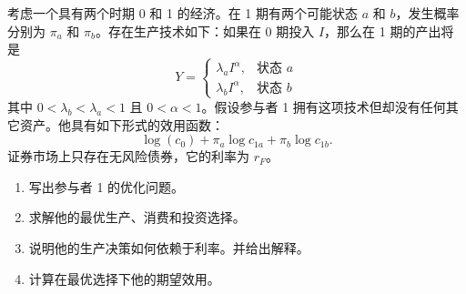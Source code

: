 
\begin{problem}
 考虑一个具有两个时期 0 和 1 的经济。在 1 期有两个可能状态 $a$ 和 $b$，发生概率分别为 $\pi_{a}$ 和 $\pi_{b}$。存在生产技术如下：如果在 0 期投入 $I$，那么在 1 期的产出将是
\[
    Y=\begin{cases}
        \lambda_{a}I^{\alpha},&\text{状态 }a\\
        \lambda_{b}I^{\alpha},&\text{状态 }b
    \end{cases}
\]
其中 $0<\lambda_{b}<\lambda_{a}<1$ 且 $0<\alpha<1$。假设参与者 1 拥有这项技术但却没有任何其它资产。他具有如下形式的效用函数：
\[
    \log(c_{0})+\pi_{a}\log c_{1a}+\pi_{b}\log c_{1b}.
\]
证券市场上只存在无风险债券，它的利率为 $r_{F}$。
\begin{enumerate}[label=(\alph*)]
    \item 写出参与者 1 的优化问题。
    \item 求解他的最优生产、消费和投资选择。
    \item 说明他的生产决策如何依赖于利率。并给出解释。
    \item 计算在最优选择下他的期望效用。
\end{enumerate}
\end{problem}
